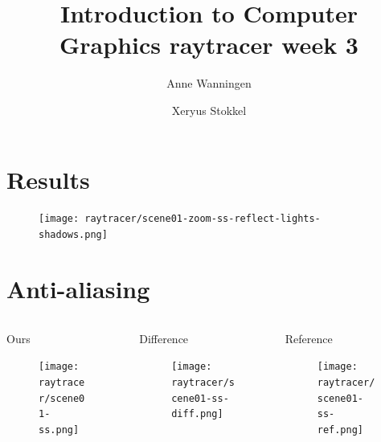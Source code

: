 \documentclass{beamer}
\author{Anne Wanningen \and Xeryus Stokkel}
\title[Week 3]{Introduction to Computer Graphics raytracer week 3}
\begin{document}
\maketitle

\section{Results}
\begin{frame}
	\begin{figure}
		\texttt{[image: raytracer/scene01-zoom-ss-reflect-lights-shadows.png]}
	\end{figure}
\end{frame}

\section{Anti-aliasing}
\begin{frame}
	\begin{columns}[T]
		\begin{column}{.3\textwidth}
			Ours
			\begin{figure}
				\texttt{[image: raytracer/scene01-ss.png]}
			\end{figure}
		\end{column}
		\begin{column}{.3\textwidth}
			Difference
			\begin{figure}
				\texttt{[image: raytracer/scene01-ss-diff.png]}
			\end{figure}
		\end{column}
		\begin{column}{.3\textwidth}
			Reference
			\begin{figure}
				\texttt{[image: raytracer/scene01-ss-ref.png]}
			\end{figure}
		\end{column}
	\end{columns}
\end{frame}
\end{document}
